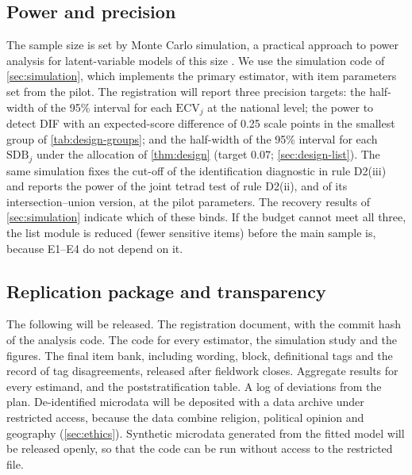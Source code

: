 \subsection{Power and precision}\label{sec:design-power}

The sample size is set by Monte Carlo simulation, a practical approach to power analysis for latent-variable models of this size \citep{muthen2002}. We use the simulation code of \cref{sec:simulation}, which implements the primary estimator, with item parameters set from the pilot. The registration will report three precision targets: the half-width of the 95\% interval for each $\mathrm{ECV}_j$ at the national level; the power to detect DIF with an expected-score difference of 0.25 scale points in the smallest group of \cref{tab:design-groups}; and the half-width of the 95\% interval for each $\mathrm{SDB}_j$ under the allocation of \cref{thm:design} (target $0.07$; \cref{sec:design-list}). The same simulation fixes the cut-off of the identification diagnostic in rule D2(iii) and reports the power of the joint tetrad test of rule D2(ii), and of its intersection--union version, at the pilot parameters. The recovery results of \cref{sec:simulation} indicate which of these binds. If the budget cannot meet all three, the list module is reduced (fewer sensitive items) before the main sample is, because E1--E4 do not depend on it.

\subsection{Replication package and transparency}\label{sec:design-replication}

The following will be released. The registration document, with the commit hash of the analysis code. The code for every estimator, the simulation study and the figures. The final item bank, including wording, block, definitional tags and the record of tag disagreements, released after fieldwork closes. Aggregate results for every estimand, and the poststratification table. A log of deviations from the plan. De-identified microdata will be deposited with a data archive under restricted access, because the data combine religion, political opinion and geography (\cref{sec:ethics}). Synthetic microdata generated from the fitted model will be released openly, so that the code can be run without access to the restricted file.

